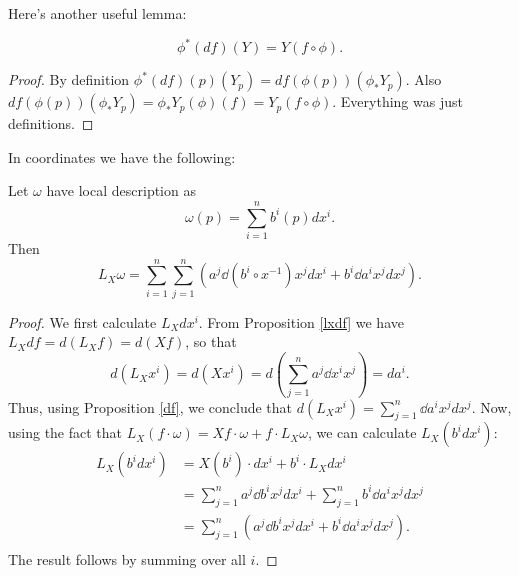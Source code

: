 \documentclass[11pt, english]{article}
\begin{document}
Here's another useful lemma:
\begin{lemma}
\[
\phi^\ast(df)(Y) = Y(f \circ \phi).
\]
\end{lemma}
\begin{proof}
By definition $\phi^\ast(df)(p)(Y_p) = df(\phi(p))(\phi_\ast Y_p)$. Also $df(\phi(p))(\phi_\ast Y_p)=\phi_\ast Y_p(\phi)(f)=Y_p(f \circ \phi)$. Everything was just definitions.
\end{proof}

In coordinates we have the following:
\begin{prop}
Let $\omega$ have local description as 
\[
\omega(p) = \sum_{i=1}^n b^i(p) dx^i.
\]
Then
\[
L_X \omega  = \sum_{i=1}^n \sum_{j=1}^n \left( a^j \dd{(b^i \circ x^{-1})}{x^j} dx^i + b^i \dd{a^i}{x^j} dx^j \right).
\]
\end{prop}
\begin{proof}
We first calculate $L_X dx^i$. From Proposition \ref{lxdf} we have $L_X df = d(L_Xf)=d(Xf)$, so that
\[
d(L_X x^i) = d(X x^i) = d\left(\sum_{j=1}^n a^j \dd{x^i}{x^j}\right) = d a^i.
\]
Thus, using Proposition \ref{df}, we conclude that $d(L_X x^i)= \sum_{j=1}^n \dd{a^i}{x^j} dx^j$. Now, using the fact that $L_X (f \cdot \omega) = Xf \cdot \omega + f \cdot L_X \omega$, we can calculate $L_X(b^i dx^i)$:
\begin{align*}
L_X(b^i dx^i) &= X(b^i) \cdot dx^i + b^i \cdot L_X dx^i \\
&= \sum_{j=1}^n a^j \dd{b^i}{x^j} dx^i + \sum_{j=1}^n b^i \dd{a^i}{x^j} dx^j \\
&= \sum_{j=1}^n \left( a^j \dd{b^i}{x^j} dx^i +  b^i \dd{a^i}{x^j} dx^j\right). \\
\end{align*}
The result follows by summing over all $i$.
\end{proof}
\end{document}
